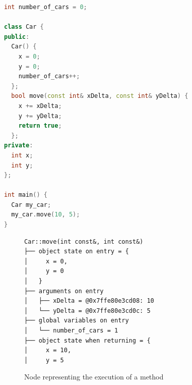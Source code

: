 \begin{definition}[Node]
\begin{exmp}
\begin{lstlisting}[language=C++, caption=Car class, frame=tb, label={lst:carClass}]
int number_of_cars = 0;

class Car {
public:
  Car() {
    x = 0;
    y = 0;
    number_of_cars++;
  };
  bool move(const int& xDelta, const int& yDelta) {
    x += xDelta;
    y += yDelta;
    return true;
  };
private:
  int x;
  int y;
};

int main() {
  Car my_car;
  my_car.move(10, 5);
}
\end{lstlisting}

\begin{figure}[ht]
\caption{Node representing the execution of a method}
\label{fig:carNode}
\begin{verbatim}
Car::move(int const&, int const&)                                                                                                                    
├── object state on entry = {                                                                                                                        
│     x = 0,                                                                                                                                         
│     y = 0                                                                                                                                          
│   }                                                                                                                                                
├── arguments on entry                                                                                                                               
│   ├── xDelta = @0x7ffe80e3cd08: 10                                                                                                                 
│   └── yDelta = @0x7ffe80e3cd0c: 5                                                                                                                  
├── global variables on entry                                                                                                                        
│   └── number_of_cars = 1                                                                                                                           
├── object state when returning = {                                                                                                                  
│     x = 10,                                                                                                                                        
│     y = 5                                                                                                                                          

\end{verbatim}
\end{figure}
\end{exmp}
\end{definition}
